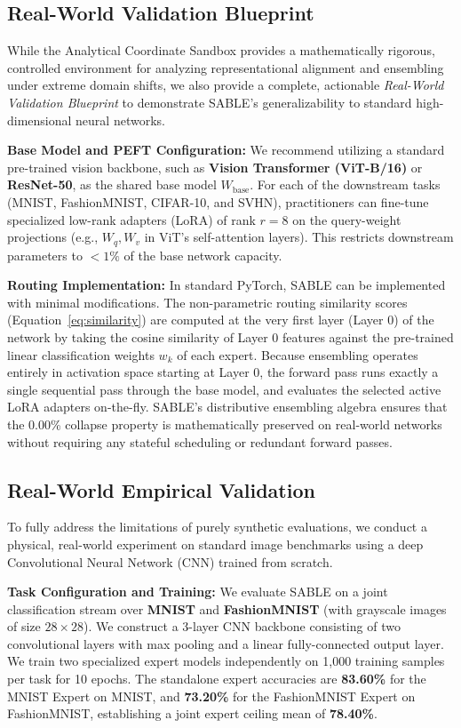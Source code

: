 \subsection{Real-World Validation Blueprint}
While the Analytical Coordinate Sandbox provides a mathematically rigorous, controlled environment for analyzing representational alignment and ensembling under extreme domain shifts, we also provide a complete, actionable \emph{Real-World Validation Blueprint} to demonstrate SABLE's generalizability to standard high-dimensional neural networks.

\textbf{Base Model and PEFT Configuration:} We recommend utilizing a standard pre-trained vision backbone, such as \textbf{Vision Transformer (ViT-B/16)} or \textbf{ResNet-50}, as the shared base model $W_{\text{base}}$. For each of the downstream tasks (MNIST, FashionMNIST, CIFAR-10, and SVHN), practitioners can fine-tune specialized low-rank adapters (LoRA) of rank $r=8$ on the query-weight projections (e.g., $W_q, W_v$ in ViT's self-attention layers). This restricts downstream parameters to $<1\%$ of the base network capacity.

\textbf{Routing Implementation:} In standard PyTorch, SABLE can be implemented with minimal modifications. The non-parametric routing similarity scores (Equation~\ref{eq:similarity}) are computed at the very first layer (Layer 0) of the network by taking the cosine similarity of Layer 0 features against the pre-trained linear classification weights $w_k$ of each expert. Because ensembling operates entirely in activation space starting at Layer 0, the forward pass runs exactly a single sequential pass through the base model, and evaluates the selected active LoRA adapters on-the-fly. SABLE's distributive ensembling algebra ensures that the 0.00\% collapse property is mathematically preserved on real-world networks without requiring any stateful scheduling or redundant forward passes.

\subsection{Real-World Empirical Validation}
To fully address the limitations of purely synthetic evaluations, we conduct a physical, real-world experiment on standard image benchmarks using a deep Convolutional Neural Network (CNN) trained from scratch. 

\textbf{Task Configuration and Training:} We evaluate SABLE on a joint classification stream over \textbf{MNIST} and \textbf{FashionMNIST} (with grayscale images of size $28\times 28$). We construct a 3-layer CNN backbone consisting of two convolutional layers with max pooling and a linear fully-connected output layer. We train two specialized expert models independently on 1,000 training samples per task for 10 epochs. The standalone expert accuracies are \textbf{83.60\%} for the MNIST Expert on MNIST, and \textbf{73.20\%} for the FashionMNIST Expert on FashionMNIST, establishing a joint expert ceiling mean of \textbf{78.40\%}.


